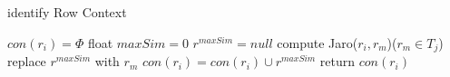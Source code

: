 \documentclass[]{article}
\title{}
\author{}
\begin{document}
	
\maketitle

\begin{abstract}
	
\end{abstract}

\section{}

\begin{algorithm}
	\caption{identify Row Context}
	$con(r_i)= \Phi$\;
	{
		float $maxSim=0$\;
		$r^{maxSim}=null$\;
		{
			compute Jaro($r_i,r_m$)($r_m\in T_j$)\;
			{
				replace $r^{maxSim}$ with $r_m$\;
			}
		}
		$con(r_i)=con(r_i)\cup {r^{maxSim}}$\;
	}
	return $con(r_i)$\;
\end{algorithm}
	
\end{document}

